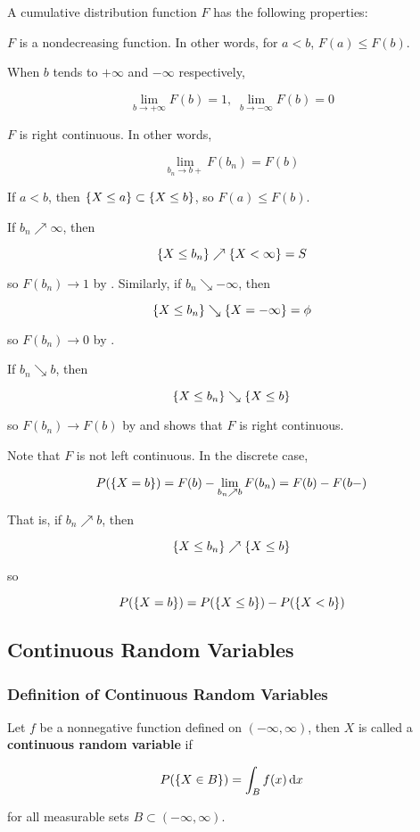 \documentclass[a4paper,12pt]{article}
\begin{document}
\begin{pst}
  A cumulative distribution function $F$ has the following properties:

  \begin{alist}
    \item $F$ is a nondecreasing function. In other words, for $a<b$, $F(a)\leq F(b)$.
    \item When $b$ tends to $+\infty$ and $-\infty$ respectively,
    
    $$\lim_{b\to+\infty}F(b)=1,\;\lim_{b\to-\infty}F(b)=0$$

    \item $F$ is right continuous. In other words,
    
    $$\lim_{b_{n}\to b+}F(b_{n})=F(b)$$
  \end{alist}

  \prf{} If $a<b$, then $\left\{ X\leq a\right\}\subset\left\{ X\leq b\right\}$, so $F(a)\leq F(b)$.\n

   If $b_{n}\nearrow\infty$, then
  
  $$\left\{ X\leq b_{n}\right\}\nearrow\left\{ X<\infty\right\}=S$$\s
  
  so $F(b_{n})\to 1$ by \rpst[\sctd{2}]. Similarly, if $b_{n}\searrow-\infty$, then
  
  $$\left\{ X\leq b_{n}\right\}\searrow\left\{ X=-\infty\right\}=\phi$$\s
  
  so $F(b_{n})\to 0$ by \rpst[\sctd{2}].\n

   If $b_{n}\searrow b$, then

  $$\left\{ X\leq b_{n}\right\}\searrow\left\{ X\leq b\right\}$$\s

  so $F(b_{n})\to F(b)$ by \rpst[\sctd{2}] and shows that $F$ is right continuous.
\end{pst}\n

Note that $F$ is not left continuous. In the discrete case,

$$P(\left\{ X=b\right\})=F(b)-\lim_{b_{n}\nearrow b}F(b_{n})=F(b)-F(b-)$$\s

That is, if $b_{n}\nearrow b$, then

$$\left\{ X\leq b_{n}\right\}\nearrow\left\{ X\leq b\right\}$$\s

so

$$P(\left\{ X=b\right\})=P(\left\{ X\leq b\right\})-P(\left\{ X<b\right\})$$

\subsection{Continuous Random Variables}
\subsubsection{Definition of Continuous Random Variables}
\begin{dft}
  Let $f$ be a nonnegative function defined on $(-\infty,\infty)$, then $X$ is called a \textbf{continuous random variable} if

  $$P(\left\{ X\in B\right\})=\int_{B}f(x)\,\mathrm{d} x$$\s

  for all measurable sets $B\subset(-\infty,\infty)$.
\end{dft}\n
\end{document}
